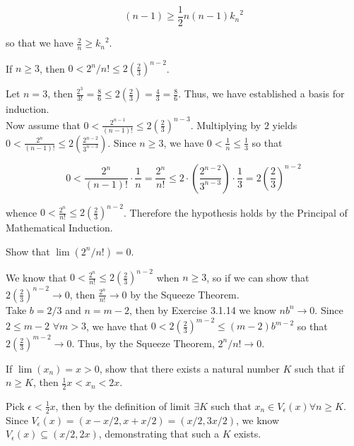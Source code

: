 \documentclass[paper=a4, fontsize=11pt]{scrartcl} %
\numberwithin{equation}{section} %
\numberwithin{figure}{section} %
\numberwithin{table}{section} %
\begin{document}
\begin{equation*}
(n - 1) \geq \frac{1}{2} n (n - 1) {k_n}^2
\end{equation*}

so that we have $\frac{2}{n} \geq {k_n}^2$.

 If $n \geq 3$, then $0 < 2^n/n! \leq 2(\frac{2}{3})^{n-2}$.

\pf Let $n = 3$, then $\frac{2^3}{3!} = \frac{8}{6} \leq 2(\frac{2}{3}) = \frac{4}{3} = \frac{8}{6}$. Thus, we have established a basis for induction.\\

Now assume that $0 < \frac{2^{n-1}}{(n-1)!} \leq 2\left(\frac{2}{3}\right)^{n-3}$. Multiplying by $2$ yields $ 0 < \frac{2^n}{(n-1)!} \leq 2\left(\frac{2^{n-2}}{3^{n-3}}\right)$. Since $n \geq 3$, we have $0 < \frac{1}{n} \leq \frac{1}{3}$ so that

\begin{equation*}
0 < \frac{2^n}{(n-1)!} \cdot \frac{1}{n} = \frac{2^n}{n!} \leq 2 \cdot \left(\frac{2^{n-2}}{3^{n-3}}\right) \cdot \frac{1}{3} = 2 \left( \frac{2}{3} \right)^{n-2} 
\end{equation*}

whence $0 < \frac{2^n}{n!} \leq 2\left(\frac{2}{3}\right)^{n-2}$. Therefore the hypothesis holds by the Principal of Mathematical Induction. \done

 Show that $\lim(2^n/n!) = 0$.

\pf We know that $0 < \frac{2^n}{n!} \leq 2\left(\frac{2}{3}\right)^{n-2}$ when $n \geq 3$, so if we can show that $2\left(\frac{2}{3}\right)^{n-2} \rightarrow 0$, then $\frac{2^n}{n!} \rightarrow 0$ by the Squeeze Theorem.\\

Take $b = 2/3$ and $n = m - 2$, then by Exercise 3.1.14 we know $nb^n \rightarrow 0$. Since $2 \leq m - 2$ $\forall m > 3$, we have that $0 < 2(\frac{2}{3})^{m-2} \leq (m-2)b^{m-2}$ so that $2\left(\frac{2}{3}\right)^{m-2} \rightarrow 0$. Thus, by the Squeeze Theorem, $2^n / n! \rightarrow 0$. \done

 If $\lim(x_n) = x > 0$, show that there exists a natural number $K$ such that if $n \geq K$, then $\frac{1}{2}x < x_n < 2x$.

\pf Pick $\epsilon < \frac{1}{2} x$, then by the definition of limit $\exists K$ such that $x_n \in V_\epsilon(x) \forall n \geq K$. Since $V_\epsilon(x) = (x - x/2, x + x/2) = (x/2, 3x/2)$, we know $V_\epsilon(x) \subseteq (x/2, 2x)$, demonstrating that such a $K$ exists. \done
\end{document}
